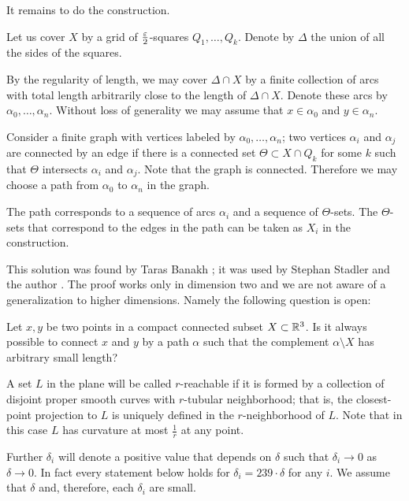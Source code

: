 It remains to do the construction.

Let us cover $X$ by a grid of $\tfrac{\varepsilon}2$-squares $Q_1,\dots,Q_k$.
Denote by $\Delta$ the union of all the sides of the squares.

By the regularity of length, we may cover $\Delta\cap X$ by a finite collection of arcs with total length arbitrarily close to the length of $\Delta\cap X$.
Denote these arcs by $\alpha_0,\dots,\alpha_n$.
Without loss of generality we may assume that $x\in\alpha_0$ and $y\in\alpha_n$.

Consider a finite graph with vertices labeled by $\alpha_0,\dots,\alpha_n$;
two vertices $\alpha_i$ and $\alpha_j$ are connected by an edge if there is a connected set $\Theta\subset  X\cap Q_k$ 
for some $k$ such that $\Theta$ intersects $\alpha_i$ and $\alpha_j$.
Note that the graph is connected. Therefore we may choose a path from $\alpha_0$ to $\alpha_n$ in the graph.

The path corresponds to a sequence of arcs $\alpha_i$ and a sequence of $\Theta$-sets.
The $\Theta$-sets that correspond to the edges in the path can be taken as $ X_i$ in the construction.
\qeds

This solution was found by Taras Banakh \cite{banakh};
it was used by Stephan Stadler and the author \cite{petrunin-stadler:revisited}.
The proof works only in dimension two and we are not aware of a generalization to higher dimensions. 
Namely the following question is open:

\begin{pr}
Let $x,y$ be two points in a compact connected subset $X\subset \mathbb{R}^3$. 
Is it always possible to connect $x$ and $y$ by a path $\alpha$ such that the complement $\alpha\setminus X$ has arbitrary small length?
\end{pr}


A set $L$ in the plane will be called $r$-reachable
if it is formed by a collection of disjoint proper smooth curves 
with $r$-tubular neighborhood;
that is, the closest-point projection to $L$ is uniquely defined in the $r$-neighborhood of $L$.
Note that in this case $L$ has curvature at most $\tfrac1r$ at any point.

Further $\delta_i$ will denote a positive value that depends on $\delta$ such that $\delta_i\to0$ as $\delta\to 0$.
In fact every statement below holds for $\delta_i=239\cdot\delta$ for any $i$.
We assume that $\delta$ and, therefore, each $\delta_i$ are small.

